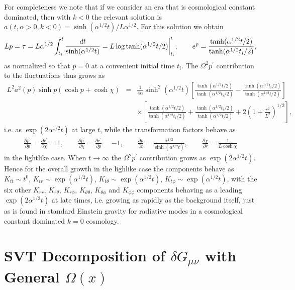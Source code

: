 \documentclass[aps]{revtex4}
\begin{document}
For completeness we note that if we consider an era that is cosmological constant dominated, then with $k<0$ the relevant solution is $a(t,\alpha>0,k<0)=\sinh(\alpha^{1/2}t)/L\alpha^{1/2}$. For this solution we obtain 
%
\begin{eqnarray}
Lp=\tau=L\alpha^{1/2}\int_{t_i}^t \frac{dt}{\sinh(\alpha^{1/2}t)}
=L \log \tanh(\alpha^{1/2}t/2)\bigg{|}_{t_i}^t,\qquad e^p=\frac{\tanh(\alpha^{1/2}t/2)}{\tanh(\alpha^{1/2}t_i/2)},
\label{B15}
\end{eqnarray}
%
as normalized so that $p=0$ at a convenient initial time $t_i$. The $\Omega^2p^{\prime}$ contribution to the fluctuations thus grows as 
%
\begin{eqnarray}
L^2a^2(p)\sinh p (\cosh p+\cosh \chi)
&=&\frac{1}{4\alpha}\sinh^2(\alpha^{1/2}t)\left[\frac{\tanh(\alpha^{1/2}t/2)}{\tanh(\alpha^{1/2}t_i/2)}-\frac{\tanh(\alpha^{1/2}t_i/2)}{\tanh(\alpha^{1/2}t/2)}\right]
\nonumber\\
&&\times\left[\frac{\tanh(\alpha^{1/2}t/2)}{\tanh(\alpha^{1/2}t_i/2)}+\frac{\tanh(\alpha^{1/2}t_i/2)}{\tanh(\alpha^{1/2}t/2)}+2\left(1+\frac{r^2}{L^2}\right)^{1/2}\right],
\label{B16}
\end{eqnarray}
%
i.e.  as $\exp(2\alpha^{1/2}t)$ at large $t$, while the transformation factors behave as 
%
\begin{eqnarray}
\frac{\partial p^{\prime }}{\partial p}=\frac{\partial r^{\prime }}{\partial \chi}=1,\qquad
\frac{\partial p^{\prime }}{\partial \chi}=\frac{\partial r^{\prime }}{\partial p}=-1,\qquad \frac{\partial p}{\partial t}=\frac{\alpha^{1/2}}{\sinh(\alpha^{1/2}t)},\qquad \frac{\partial \chi}{\partial r}=\frac{1}{L\cosh\chi}
\label{B17}
\end{eqnarray}
%
in the lightlike case. When $t \rightarrow\infty$ the $\Omega^2p^{\prime}$ contribution grows as $\exp(2\alpha^{1/2}t)$. Hence for the overall growth in the lighlike case the components behave as $K_{tt}\sim t^0$, $K_{tr}\sim \exp(\alpha^{1/2}t)$, $K_{t\theta}\sim \exp(\alpha^{1/2}t)$, $K_{t\phi}\sim \exp(\alpha^{1/2}t)$, with the six other  $K_{rr}$, $K_{r\theta}$, $K_{r\phi}$, $K_{\theta\theta}$, $K_{\theta\phi}$ and $K_{\phi\phi}$ components behaving as a leading $\exp(2\alpha^{1/2}t)$ at late times, i.e. growing as rapidly as the background itself, just as is found in standard Einstein gravity for radiative modes in a cosmological constant dominated $k=0$ cosmology.


\section{SVT Decomposition of  $\delta G_{\mu\nu}$ with General $\Omega(x)$}
\label{SC}
\end{document}
